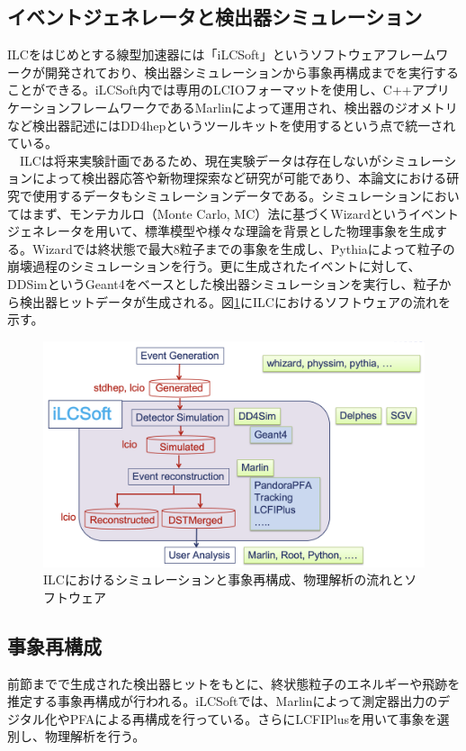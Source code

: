 \subsection{イベントジェネレータと検出器シミュレーション}
ILCをはじめとする線型加速器には「iLCSoft」というソフトウェアフレームワークが開発されており、検出器シミュレーションから事象再構成までを実行することができる。iLCSoft内では専用のLCIOフォーマットを使用し、C++アプリケーションフレームワークであるMarlinによって運用され、検出器のジオメトリなど検出器記述にはDD4hepというツールキットを使用するという点で統一されている。\\
　ILCは将来実験計画であるため、現在実験データは存在しないがシミュレーションによって検出器応答や新物理探索など研究が可能であり、本論文における研究で使用するデータもシミュレーションデータである。シミュレーションにおいてはまず、モンテカルロ（Monte Carlo, MC）法に基づくWizardというイベントジェネレータを用いて、標準模型や様々な理論を背景とした物理事象を生成する。Wizardでは終状態で最大8粒子までの事象を生成し、Pythiaによって粒子の崩壊過程のシミュレーションを行う。更に生成されたイベントに対して、DDSimというGeant4をベースとした検出器シミュレーションを実行し、粒子から検出器ヒットデータが生成される。図\ref{ilcsoft}にILCにおけるソフトウェアの流れを示す。
\begin{figure}[h]
	\begin{center}
 \includegraphics[keepaspectratio, scale=0.25]
 	{Figure/Introduction/ilcsoft.png}
 		\caption {ILCにおけるシミュレーションと事象再構成、物理解析の流れとソフトウェア}
 		\label{ilcsoft}
	\end{center}
\end{figure}
\subsection{事象再構成}
前節までで生成された検出器ヒットをもとに、終状態粒子のエネルギーや飛跡を推定する事象再構成が行われる。iLCSoftでは、Marlinによって測定器出力のデジタル化やPFAによる再構成を行っている。さらにLCFIPlusを用いて事象を選別し、物理解析を行う。
